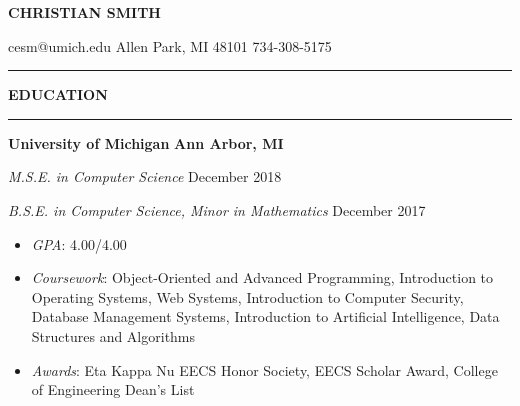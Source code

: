 \documentclass[10pt]{article}
\begin{document}
\setlength{\parskip}{1mm}

\newcommand{\name}[1]{
  \begin{center} \LARGE \textbf{#1} \end{center}
}

\newcommand{\contact}[1]{
  \begin{center} \large #1 \end{center}
}

\newcommand{\sectiontitle}[1]{
  \rule{\columnwidth}{1pt}
  \par\nointerlineskip
  { \large \textbf{#1} }
  \par\nointerlineskip
  \rule{\columnwidth}{3pt}\par
}

\newcommand{\employer}[2]{
  \noindent \textbf{#1} \hfill \textbf{#2} \par
}

\newcommand{\job}[2]{
  \noindent \textit{#1} \hfill #2 \par
}

\newcommand{\bullettitle}[1]{
  \textit{#1}:
}

\newenvironment{bullets}{
  \begin{itemize}
}{
  \end{itemize}
  \vspace{0.05in}
}

\name{CHRISTIAN SMITH}
\contact{cesm@umich.edu \textbar \hspace{0.1mm} Allen Park, MI 48101 \textbar \hspace{0.1mm} 734-308-5175}

\sectiontitle{EDUCATION}

\employer{University of Michigan}{Ann Arbor, MI}
\job{M.S.E. in Computer Science}{December 2018}
\job{B.S.E. in Computer Science, Minor in Mathematics}{December 2017}
\begin{bullets}
  \item \bullettitle{GPA} 4.00/4.00
  \item \bullettitle{Coursework} Object-Oriented and Advanced Programming, Introduction to Operating Systems,
        Web Systems, Introduction to Computer Security, Database Management Systems, Introduction to Artificial Intelligence,
        Data Structures and Algorithms
  \item \bullettitle{Awards} Eta Kappa Nu EECS Honor Society, EECS Scholar Award, College of Engineering
      Dean's List
\end{bullets}
\end{document}
